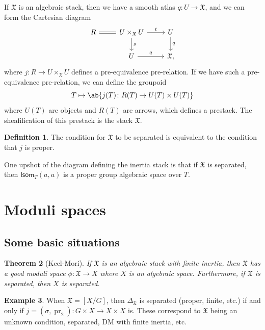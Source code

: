\documentclass{amsart}
\newtheorem{thm}{Theorem}[section]
\theoremstyle{definition}
\newtheorem{defn}[thm]{Definition}
\newtheorem{exm}[thm]{Example}
\theoremstyle{remark}
\theoremstyle{plain}
\theoremstyle{definition}
\theoremstyle{remark}
\newcommand{\mf}[1]{\mathfrak{#1}}
\newcommand{\on}[1]{\operatorname{#1}}
\newcommand{\ms}[1]{\mathsf{#1}}
\newcommand{\1}{\mathbf{1}}
\newcommand{\2}{\mathbf{2}}
\newcommand{\3}{\mathbf{3}}
\begin{document}
If \(\mf{X}\) is an algebraic stack, then we have a smooth atlas \(q \colon U \to \mf{X}\), and we can form the Cartesian diagram
\begin{equation*}
\begin{tikzcd}
    R \ar[equals]{r} & U \times_{\mf{X}} U \ar{r}{t} \ar{d}{s} & U \ar{d}{q} \\
    & U \ar{r}{q} & \mf{X},
\end{tikzcd}
\end{equation*}
where \(j \colon R \to U \times_{\mf{X}} U\) defines a pre-equivalence pre-relation. If we have such a pre-equivalence pre-relation, we can define the groupoid
\[ T \mapsto \ab\{ j(T) \colon R(T) \to U(T) \times U(T) \} \]
where \(U(T)\) are objects and \(R(T)\) are arrows, which defines a prestack. The sheafification of this prestack is the stack \(\mf{X}\).

\begin{defn}
    The condition for \(\mf{X}\) to be separated is equivalent to the condition that \(j\) is proper.
\end{defn}

One upshot of the diagram defining the inertia stack is that if \(\mf{X}\) is separated, then \(\ms{Isom}_T(a,a)\) is a proper group algebraic space over \(T\).

\section{Moduli spaces}%
\label{sec:Moduli spaces}

\subsection{Some basic situations}%
\label{sub:Some basic situations}

\begin{thm}[Keel-Mori]
    If \(\mf{X}\) is an algebraic stack with finite inertia, then \(\mf{X}\) has a good moduli space \(\phi \colon \mf{X} \to X\) where \(X\) is an algebraic space. Furthermore, if \(\mf{X}\) is separated, then \(X\) is separated.
\end{thm}

\begin{exm}
    When \(\mf{X} = [X/G]\), then \(\Delta_{\mf{X}}\) is separated (proper, finite, etc.) if and only if \(j = (\sigma, \on{pr}_2) \colon G \times X \to X \times X\) is. These correspond to \(\mf{X}\) being an unknown condition, separated, DM with finite inertia, etc.
\end{exm}
\end{document}
